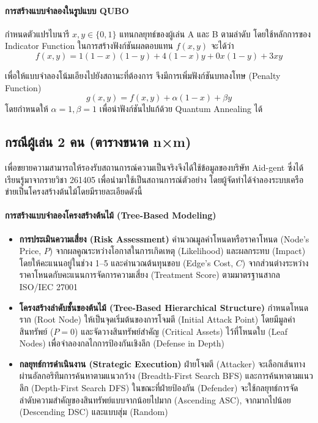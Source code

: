 \paragraph{การสร้างแบบจำลองในรูปแบบ QUBO}
กำหนดตัวแปรไบนารี $x, y \in \{0,1\}$ แทนกลยุทธ์ของผู้เล่น A และ B ตามลำดับ โดยใช้หลักการของ Indicator Function ในการสร้างฟังก์ชันผลตอบแทน $f(x,y)$ จะได้ว่า
\begin{equation}
f(x,y) = 1(1-x)(1-y) + 4(1-x)y + 0x(1-y) + 3xy
\end{equation}

\noindent เพื่อให้แบบจำลองโน้มเอียงไปยังสถานะที่ต้องการ จึงมีการเพิ่มฟังก์ชันบทลงโทษ (Penalty Function) 
\begin{equation}
g(x,y) = f(x,y) + \alpha(1-x) + \beta y
\end{equation}
โดยกำหนดให้ $\alpha=1, \beta=1$ เพื่อนำฟังก์ชันไปแก้ด้วย Quantum Annealing ได้

\subsection{กรณีผู้เล่น 2 คน (ตารางขนาด n×m)}
เพื่อขยายความสามารถให้รองรับสถานการณ์ความเป็นจริงจึงได้ใช้ข้อมูลของบริษัท Aid-gent ซึ่งได้เรียนรู้มาจากรายวิชา 261405 เพื่อนำมาใช้เป็นสถานการณ์ตัวอย่าง โดยผู้จัดทำได้จำลองระบบเครือข่ายเป็นโครงสร้างต้นไม้โดยมีรายละเอียดดังนี้

\paragraph{การสร้างแบบจำลองโครงสร้างต้นไม้ (Tree-Based Modeling)}
\begin{itemize}
    \item \textbf{การประเมินความเสี่ยง (Risk Assessment)} คำนวณมูลค่าโหนดหรือราคาโหนด (Node's Price, $P$) จากผลคูณระหว่างโอกาสในการเกิดเหตุ (Likelihood) และผลกระทบ (Impact) โดยให้คะแนนอยู่ในช่วง 1--5 และคำนวณต้นทุนขอบ (Edge's Cost, $C$) จากส่วนต่างระหว่างราคาโหนดกับคะแนนการจัดการความเสี่ยง (Treatment Score) ตามมาตรฐานสากล ISO/IEC 27001
    \item \textbf{โครงสร้างลำดับชั้นของต้นไม้ (Tree-Based Hierarchical Structure)} กำหนดโหนดราก (Root Node) ให้เป็นจุดเริ่มต้นของการโจมตี (Initial Attack Point) โดยมีมูลค่าสินทรัพย์ ($P=0$) และจัดวางสินทรัพย์สำคัญ (Critical Assets) ไว้ที่โหนดใบ (Leaf Nodes) เพื่อจำลองกลไกการป้องกันเชิงลึก (Defense in Depth)
    \item \textbf{กลยุทธ์การดำเนินงาน (Strategic Execution)} ฝ่ายโจมตี (Attacker) จะเลือกเส้นทางผ่านอัลกอริทึมการค้นหาตามแนวกว้าง (Breadth-First Search BFS) และการค้นหาตามแนวลึก (Depth-First Search DFS) ในขณะที่ฝ่ายป้องกัน (Defender) จะใช้กลยุทธ์การจัดลำดับความสำคัญของสินทรัพย์แบบจากน้อยไปมาก (Ascending ASC), จากมากไปน้อย (Descending DSC) และแบบสุ่ม (Random)
\end{itemize}

